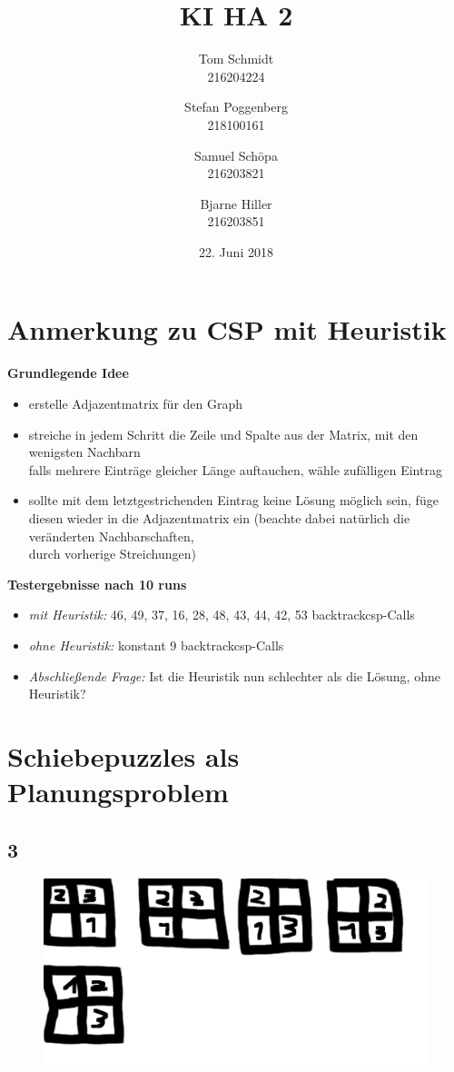 \documentclass[fleqn]{scrartcl}
\author{Tom Schmidt\\216204224 \and Stefan Poggenberg\\218100161 \and Samuel Schöpa\\216203821 \and Bjarne Hiller\\216203851}
\title{KI HA 2}
\date{22. Juni 2018}
\begin{document}
\maketitle

\section{Anmerkung zu CSP mit Heuristik}
\textbf{Grundlegende Idee}
\begin{itemize}
	\item erstelle Adjazentmatrix für den Graph
 	\item streiche in jedem Schritt die Zeile und Spalte aus der Matrix, mit den wenigsten Nachbarn \\
 	falls mehrere Einträge gleicher Länge auftauchen, wähle zufälligen Eintrag
	\item sollte mit dem letztgestrichenden Eintrag keine Lösung möglich sein, füge diesen wieder in die Adjazentmatrix ein (beachte dabei natürlich die veränderten Nachbarschaften, \\
durch vorherige Streichungen)	 
\end{itemize}
\textbf{Testergebnisse nach 10 runs}
\begin{itemize}
	\item \textit{mit Heuristik: } 46, 49, 37, 16, 28, 48, 43, 44, 42, 53  backtrackcsp-Calls
	\item \textit{ohne Heuristik: } konstant 9 backtrackcsp-Calls
	\item \textit{Abschließende Frage: } Ist die Heuristik nun schlechter als die Lösung, ohne Heuristik?
\end{itemize}

\section{Schiebepuzzles als Planungsproblem}
\subsection{3}
\begin{figure}[h!]
  \includegraphics[width=\linewidth]{a2/3.PNG}
\end{figure}
\end{document}
